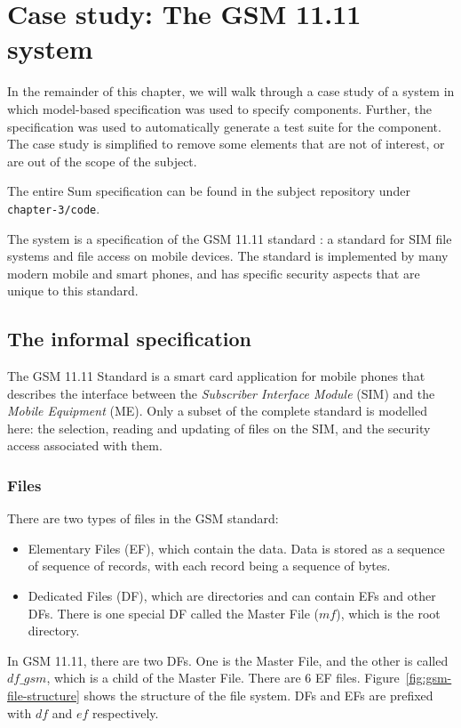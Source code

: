 \section{Case study: The GSM 11.11 system}

In the remainder of this chapter, we will walk through a case study of a system in which model-based specification was used to specify components. Further, the specification was used to automatically generate a test suite for the component. The case study is simplified to remove some elements that are not of interest, or are out of the scope of the subject.

The entire Sum specification can be found in the subject repository under \texttt{chapter-3/code}.

The system is a specification of the GSM 11.11 standard \cite{gsm99}: a standard for SIM file systems and file access on mobile devices. The standard is implemented by many modern mobile and smart phones, and has specific security aspects that are unique to this standard.

\subsection{The informal specification}
The GSM 11.11 Standard is a smart card application for mobile phones
that describes the interface between the {\em Subscriber Interface
  Module} (SIM) and the {\em Mobile Equipment} (ME).  Only a subset of the complete standard is modelled here: the selection, reading and updating of files on the SIM, and the
security access associated with them.

\subsubsection{Files}

There are two types of files in the GSM standard:
\begin{itemize}
\item Elementary Files (EF), which contain the data. Data is 
stored as a sequence of sequence of records, with each record
being a sequence of bytes.
\item Dedicated Files (DF), which are directories and can contain
EFs and other DFs. There is one special DF called the Master File
($\mathit{mf}$), which is the root directory.
\end{itemize}

In GSM 11.11, there are two DFs. One is the Master File, and the other
is called $df\_gsm$, which is a child of the Master File.  There are 6
EF files.  Figure~\ref{fig:gsm-file-structure} shows the structure of
the file system. DFs and EFs are prefixed with $df$ and $ef$
respectively.

